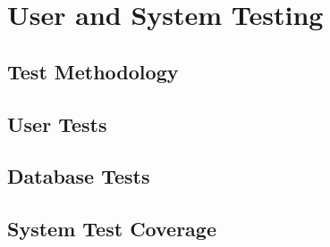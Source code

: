 \chapter{User and System Testing}

\section{Test Methodology}

\section{User Tests}

\section{Database Tests}

\section{System Test Coverage}
